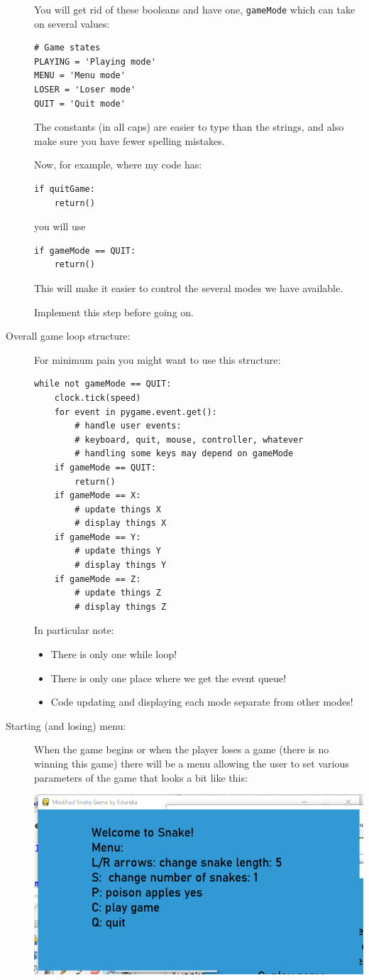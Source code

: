 \documentclass[12pt]{article}
\begin{document}
\begin{description}
You will get rid of these booleans and have one, \lstinline{gameMode}
which can take on several values:
\begin{lstlisting}
# Game states
PLAYING = 'Playing mode'
MENU = 'Menu mode'
LOSER = 'Loser mode'
QUIT = 'Quit mode'
\end{lstlisting}
The constants (in all caps) are easier to type than the strings,
and also make sure you have fewer spelling mistakes.

Now, for example, where my code has:
\begin{lstlisting}
if quitGame:
    return()
\end{lstlisting}
you will use
\begin{lstlisting}
if gameMode == QUIT:
    return()
\end{lstlisting}
This will make it easier to control the several modes we have 
available.

Implement this step before going on.

\item[Overall game loop structure:]
For minimum pain you might want to use this structure:
\begin{lstlisting}
while not gameMode == QUIT:
    clock.tick(speed)
    for event in pygame.event.get():
        # handle user events:
        # keyboard, quit, mouse, controller, whatever
        # handling some keys may depend on gameMode
    if gameMode == QUIT:
        return()
    if gameMode == X:
        # update things X
        # display things X
    if gameMode == Y:
        # update things Y
        # display things Y
    if gameMode == Z:
        # update things Z
        # display things Z
\end{lstlisting}
    
In particular note:
\begin{itemize}
\item There is only one while loop!
\item There is only one place where we get the event queue!
\item Code updating and displaying each mode separate from other modes!
\end{itemize}

\item[Starting (and losing) menu:]
When the game begins or when the player loses a game
(there is no winning this game) there will be a menu
allowing the user to set various parameters of the game
that looks a bit like this:

\centerline{\includegraphics[scale=0.25]{menu}}


\end{description}
\end{document}
